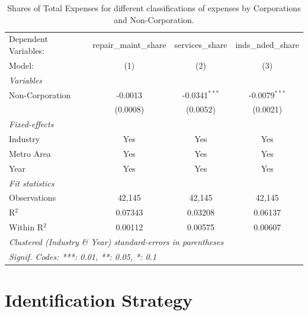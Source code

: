 \documentclass[
  12pt]{article}
\theoremstyle{definition}
\theoremstyle{remark}
\begin{document}
\begin{table}

\caption{\label{tbl-reg-shares-3}Shares of Total Expenses for different
classifications of expenses by Corporations and Non-Corporation.}

\begin{minipage}{\linewidth}

\begingroup
\centering
\begin{tabular}{lccc}
   \tabularnewline \midrule \midrule
   Dependent Variables: & repair\_maint\_share   & services\_share  & inds\_nded\_share\\    
   Model:               & (1)                    & (2)              & (3)\\  
   \midrule
   \emph{Variables}\\
   Non-Corporation      & -0.0013                & -0.0341$^{***}$  & -0.0079$^{***}$\\   
                        & (0.0008)               & (0.0052)         & (0.0021)\\   
   \midrule
   \emph{Fixed-effects}\\
   Industry             & Yes                    & Yes              & Yes\\  
   Metro Area           & Yes                    & Yes              & Yes\\  
   Year                 & Yes                    & Yes              & Yes\\  
   \midrule
   \emph{Fit statistics}\\
   Observations         & 42,145                 & 42,145           & 42,145\\  
   R$^2$                & 0.07343                & 0.03208          & 0.06137\\  
   Within R$^2$         & 0.00112                & 0.00575          & 0.00607\\  
   \midrule \midrule
   \multicolumn{4}{l}{\emph{Clustered (Industry \& Year) standard-errors in parentheses}}\\
   \multicolumn{4}{l}{\emph{Signif. Codes: ***: 0.01, **: 0.05, *: 0.1}}\\
\end{tabular}
\par\endgroup

\end{minipage}%

\end{table}%

\section{Identification Strategy}\label{sec-id-strat}
\end{document}
